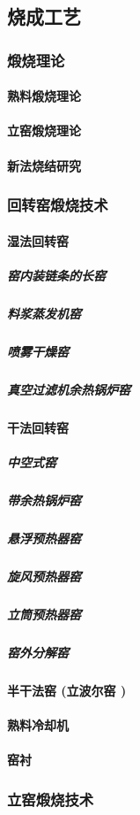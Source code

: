 \documentclass[UTF8]{../../ApplicationUniverse}
\begin{document}
    \subsection{烧成工艺}
        \subsubsection{煅烧理论}
            \paragraph{熟料煅烧理论}
            \paragraph{立窑煅烧理论}
            \paragraph{新法烧结研究}
        \subsubsection{回转窑煅烧技术}
            \paragraph{湿法回转窑}
                \subparagraph{窑内装链条的长窑}
                \subparagraph{料浆蒸发机窑}
                \subparagraph{喷雾干燥窑}
                \subparagraph{真空过滤机余热锅炉窑}
            \paragraph{干法回转窑}
                \subparagraph{中空式窑}
                \subparagraph{带余热锅炉窑}
                \subparagraph{悬浮预热器窑}
                \subparagraph{旋风预热器窑}
                \subparagraph{立筒预热器窑}
                \subparagraph{窑外分解窑}
            \paragraph{半干法窑 (立波尔窑 )}
            \paragraph{熟料冷却机}
            \paragraph{窑衬}
        \subsubsection{立窑煅烧技术}
\end{document}
